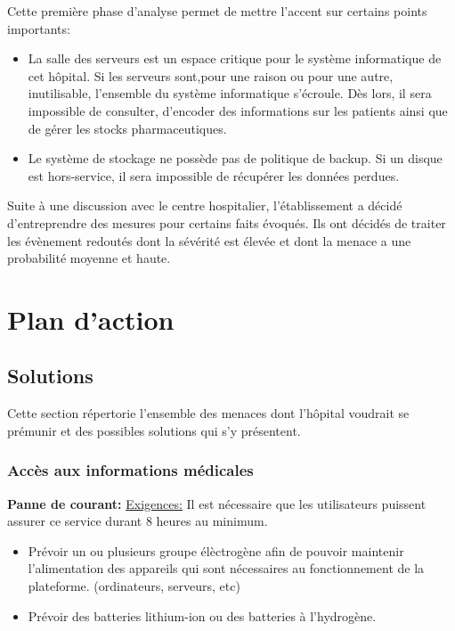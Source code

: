 \documentclass[12pt]{article}
\begin{document}
\justify
Cette première phase d'analyse permet de mettre l'accent sur certains points importants:
\begin{itemize}
\item La salle des serveurs est un espace critique pour le système informatique de cet hôpital. Si les serveurs sont,pour une raison ou pour une autre, inutilisable, l'ensemble du système informatique s'écroule. Dès lors, il sera impossible de consulter, d'encoder des informations sur les patients ainsi que de gérer les stocks pharmaceutiques.
\item Le système de stockage ne possède pas de politique de backup. Si un disque est hors-service, il sera impossible de récupérer les données perdues.
\end{itemize}
\justify
Suite à une discussion avec le centre hospitalier, l'établissement a décidé d'entreprendre des mesures pour certains faits évoqués. Ils ont décidés de traiter les évènement redoutés dont la sévérité est élevée et dont la menace a une probabilité moyenne et haute.

\section{Plan d'action}

\subsection{Solutions}

Cette section répertorie l'ensemble des menaces dont l'hôpital voudrait se prémunir et des possibles solutions qui s'y présentent.

\subsubsection{Accès aux informations médicales}

\justify
\textbf{Panne de courant:}
\justify
\underline{Exigences:} Il est nécessaire que les utilisateurs puissent assurer ce service durant 8 heures au minimum.

\begin{itemize}
	\item Prévoir un ou plusieurs groupe élèctrogène afin de pouvoir maintenir l'alimentation des appareils qui sont nécessaires au fonctionnement de la plateforme. (ordinateurs, serveurs, etc)
	\item Prévoir des batteries lithium-ion ou des batteries à l'hydrogène.
\end{itemize}
\end{document}
